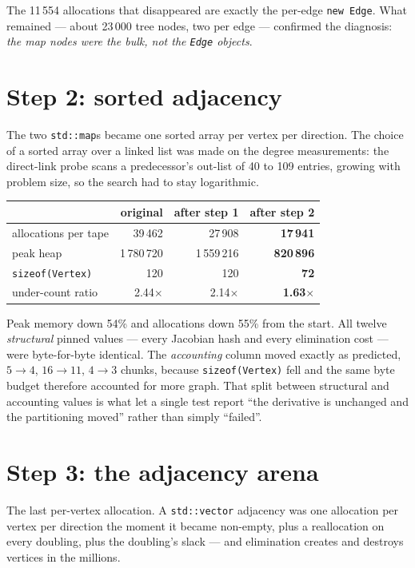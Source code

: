 \documentclass[11pt,a4paper]{report}
\newcommand{\code}[1]{\texttt{#1}}
\begin{document}
\noindent
The 11\,554 allocations that disappeared are exactly the per-edge \code{new
Edge}. What remained --- about 23\,000 tree nodes, two per edge --- confirmed the
diagnosis: \emph{the map nodes were the bulk, not the \code{Edge} objects}.

\section{Step 2: sorted adjacency}

The two \code{std::map}s became one sorted array per vertex per direction. The
choice of a sorted array over a linked list was made on the degree
measurements: the direct-link probe scans a predecessor's out-list of 40 to 109
entries, growing with problem size, so the search had to stay logarithmic.

\begin{center}
\begin{tabular}{@{}lrrr@{}}
\toprule
 & original & after step 1 & \textbf{after step 2} \\
\midrule
allocations per tape & 39\,462 & 27\,908 & \textbf{17\,941} \\
peak heap            & 1\,780\,720 & 1\,559\,216 & \textbf{820\,896} \\
\code{sizeof(Vertex)} & 120 & 120 & \textbf{72} \\
under-count ratio     & 2.44$\times$ & 2.14$\times$ & \textbf{1.63$\times$} \\
\bottomrule
\end{tabular}
\end{center}

\noindent
Peak memory down 54\% and allocations down 55\% from the start. All twelve
\emph{structural} pinned values --- every Jacobian hash and every elimination
cost --- were byte-for-byte identical. The \emph{accounting} column moved exactly
as predicted, $5\to4$, $16\to11$, $4\to3$ chunks, because \code{sizeof(Vertex)}
fell and the same byte budget therefore accounted for more graph. That split
between structural and accounting values is what let a single test report
``the derivative is unchanged and the partitioning moved'' rather than simply
``failed''.

\section{Step 3: the adjacency arena}

The last per-vertex allocation. A \code{std::vector} adjacency was one
allocation per vertex per direction the moment it became non-empty, plus a
reallocation on every doubling, plus the doubling's slack --- and elimination
creates and destroys vertices in the millions.
\end{document}
